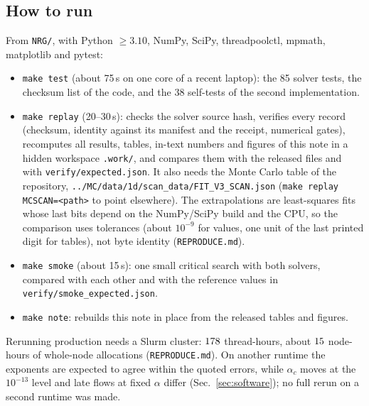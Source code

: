 \documentclass[10pt,a4paper]{article}
\newcommand{\code}[1]{\texttt{#1}}
\begin{document}
\subsection{How to run}
From \code{NRG/}, with Python $\ge3.10$, NumPy, SciPy, threadpoolctl, mpmath, matplotlib and pytest:
\begin{itemize}
\item \code{make test} (about 75\,s on one core of a recent laptop): the 85 solver tests, the checksum list of the code, and the 38
  self-tests of the second implementation.
\item \code{make replay} (20--30\,s): checks the solver source hash, verifies every record (checksum, identity against its manifest and
  the receipt, numerical gates), recomputes all results, tables, in-text numbers and figures of this note in a hidden workspace
  \code{.work/}, and compares them with the released files and with \code{verify/expected.json}. It also needs the Monte Carlo table of
  the repository, \code{../MC/data/1d/scan\_data/FIT\_V3\_SCAN.json} (\code{make replay MCSCAN=<path>} to point elsewhere). The
  extrapolations are least-squares fits whose last bits depend on the NumPy/SciPy build and the CPU, so the comparison uses
  tolerances (about $10^{-9}$ for values, one unit of the last printed digit for tables), not byte identity (\code{REPRODUCE.md}).
\item \code{make smoke} (about 15\,s): one small critical search with both solvers, compared with each other and with the
  reference values in \code{verify/smoke\_expected.json}.
\item \code{make note}: rebuilds this note in place from the released tables and figures.
\end{itemize}
Rerunning production needs a Slurm cluster: $178$ thread-hours, about $15$ node-hours of whole-node allocations
(\code{REPRODUCE.md}). On another runtime the exponents are expected to agree within the quoted errors, while $\alpha_c$ moves at the
$10^{-13}$ level and late flows at fixed $\alpha$ differ (Sec.~\ref{sec:software}); no full rerun on a second runtime was made.
\end{document}

